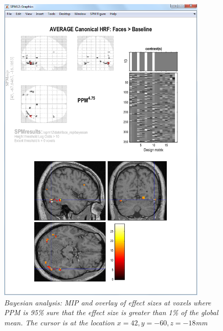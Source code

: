 \documentclass[a4paper,titlepage]{book}
\begin{document}
\begin{figure}
\begin{center}
\includegraphics[width=100mm]{faces/face_bayes}
\caption{\em Bayesian analysis: MIP and overlay of effect sizes at voxels where PPM is 95\% sure that the effect size is greater than 1\% of the global mean. The cursor is at the location $x=42,y=-60,z=-18$mm\label{face_bayes} }
\end{center}
\end{figure}
\end{document}
